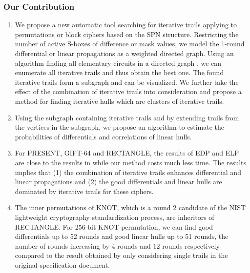 \subsubsection{Our Contribution}
\begin{enumerate}
    \item We propose a new automatic tool searching for iterative trails applying to permutations or block ciphers based on the SPN structure. Restricting the number of active S-boxes of difference or mask values, we model the 1-round differential or linear propagations as a weighted directed graph. Using an algorithm finding all elementary circuits in a directed graph \cite{J75}, we can enumerate all iterative trails and thus obtain the best one. The found iterative trails form a subgraph and can be visualized. We further take the effect of the combination of iterative trails into consideration and propose a method for finding iterative hulls which are clusters of iterative trails. 
    \item Using the subgraph containing iterative trails and by extending trails from the vertices in the subgraph, we propose an algorithm to estimate the probabilities of differentials and correlations of linear hulls. 
    \item For PRESENT, GIFT-64 and RECTANGLE, the results of EDP and ELP are close to the results in \cite{HV18} while our method costs much less time. The results implies that (1) the combination of iterative trails enhances differential and linear propagations and (2) the good differentials and linear hulls are dominated by iterative trails for these ciphers.
    \item The inner permutations of KNOT, which is a round 2 candidate of the NIST lightweight cryptography standardization process, are inheritors of RECTANGLE. For 256-bit KNOT permutation, we can find good differentials up to 52 rounds and good linear hulls up to 51 rounds, the number of rounds increasing by 4 rounds and 12 rounds respectively compared to the result obtained by only considering single trails in the original specification document. 

\end{enumerate}
